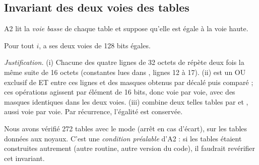 \subsection{Invariant des deux voies des tables}
A2 lit la \emph{voie basse} de chaque table et suppose qu'elle est égale à la voie haute.
\begin{lemme}\label{lem:voies}\Pc{} Pour tout $i$,  a ses deux voies de 128 bits égales.
\end{lemme}
\emph{Justification.} (i) Chacune des quatre lignes de 32 octets de  répète deux fois la même suite de 16 octets (constantes lues dans , lignes 12 à 17). (ii)  est un OU exclusif de ET entre ces lignes et des masques obtenus par  décalé puis comparé ; ces opérations agissent par élément de 16 bits, donc voie par voie, avec des masques identiques dans les deux voies. (iii)  combine deux telles tables par \code{^} et , aussi voie par voie. Par récurrence, l'égalité est conservée.

\Pe{} Nous avons vérifié 272 tables avec le mode  (arrêt en cas d'écart), sur les tables données aux noyaux. C'est une \emph{condition préalable} d'A2 : si les tables étaient construites autrement (autre routine, autre version du code), il faudrait revérifier cet invariant.


